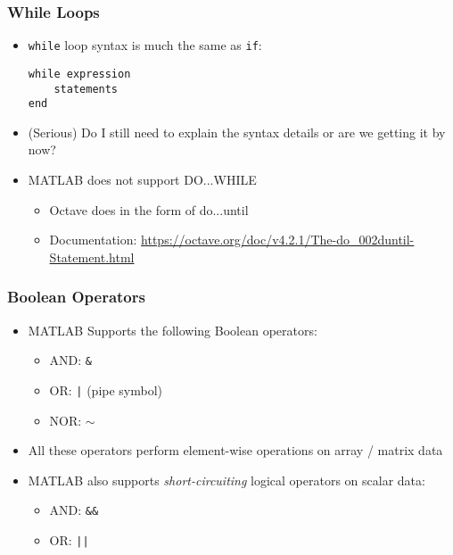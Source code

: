 \documentclass[14pt]{beamer}
\begin{document}
\begin{frame}[fragile]
\frametitle{While Loops}
\begin{itemize}
\item \texttt{while} loop syntax is much the same as \texttt{if}:
\begin{lstlisting}[style=pseudo]
while expression
    statements
end
\end{lstlisting}
\item (Serious) Do I still need to explain the syntax details or are we getting it by now?
\item MATLAB does not support DO...WHILE
	\begin{itemize}
		\item Octave does in the form of do...until
		\item Documentation: \url{https://octave.org/doc/v4.2.1/The-do_002duntil-Statement.html}
	\end{itemize}
\end{itemize}
\end{frame}

\begin{frame}
\frametitle{Boolean Operators}
\begin{itemize}
\item MATLAB Supports the following Boolean operators:
	\begin{itemize}
		\item AND: \texttt{\&}
		\item OR: \texttt{|} (pipe symbol)
		\item NOR: \texttt{$\sim$}
	\end{itemize}
\item All these operators perform element-wise operations on array / matrix data
\item MATLAB also supports \textit{short-circuiting} logical operators on scalar data:
	\begin{itemize}
		\item AND: \texttt{\&\&}
		\item OR: \texttt{||}
	\end{itemize}
\end{itemize}
\end{frame}
\end{document}
